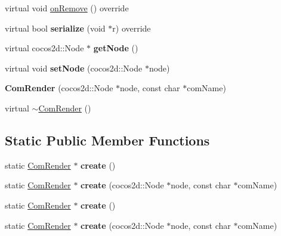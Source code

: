 \begin{DoxyCompactItemize}
virtual void \hyperlink{classcocostudio_1_1ComRender_a4eb73aa3d19d0fc02502007b91e81b34}{on\+Remove} () override
\item 
\mbox{\label{classcocostudio_1_1ComRender_af1d79593ee90c368196f6b6d2deceb16}} 
virtual bool {\bfseries serialize} (void $\ast$r) override
\item 
\mbox{\label{classcocostudio_1_1ComRender_ae333861f939de19d511bf12d961b018e}} 
virtual cocos2d\+::\+Node $\ast$ {\bfseries get\+Node} ()
\item 
\mbox{\label{classcocostudio_1_1ComRender_a384109db1754e2e54787bcc258b89c66}} 
virtual void {\bfseries set\+Node} (cocos2d\+::\+Node $\ast$node)
\item 
\mbox{\label{classcocostudio_1_1ComRender_a6955dcd1ab91ca9713980ebe7b810b34}} 
{\bfseries Com\+Render} (cocos2d\+::\+Node $\ast$node, const char $\ast$com\+Name)
\item 
virtual \hyperlink{classcocostudio_1_1ComRender_a5a3705ccd055a986bd67a8761edf8474}{$\sim$\+Com\+Render} ()
\end{DoxyCompactItemize}
\subsection*{Static Public Member Functions}
\begin{DoxyCompactItemize}
\item 
\mbox{\label{classcocostudio_1_1ComRender_ae11b8a49f03bd8f9416f6c55c7546009}} 
static \hyperlink{classcocostudio_1_1ComRender}{Com\+Render} $\ast$ {\bfseries create} ()
\item 
\mbox{\label{classcocostudio_1_1ComRender_afe75426d02fe5868e9129877c83c72b6}} 
static \hyperlink{classcocostudio_1_1ComRender}{Com\+Render} $\ast$ {\bfseries create} (cocos2d\+::\+Node $\ast$node, const char $\ast$com\+Name)
\item 
\mbox{\label{classcocostudio_1_1ComRender_a5ab8eed8e5fd9bc10cfec8dc286dd338}} 
static \hyperlink{classcocostudio_1_1ComRender}{Com\+Render} $\ast$ {\bfseries create} ()
\item 
\mbox{\label{classcocostudio_1_1ComRender_a678d086a44c4a9719e9e2f7c766479af}} 
static \hyperlink{classcocostudio_1_1ComRender}{Com\+Render} $\ast$ {\bfseries create} (cocos2d\+::\+Node $\ast$node, const char $\ast$com\+Name)
\end{DoxyCompactItemize}

